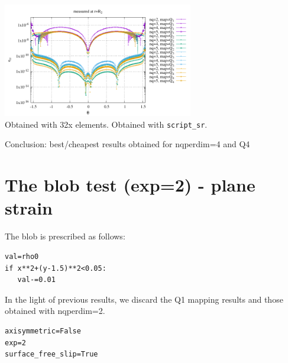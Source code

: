 \begin{center}
\includegraphics[width=8.3cm]{python_codes/fieldstone_152/results/exp1_axisymmetric/err_R2}\\
{\captionfont Obtained with 32x elements. Obtained with {\tt script\_sr}.}
\end{center}

Conclusion: best/cheapest results obtained for nqperdim=4 and Q4



\newpage
\section*{The blob test (exp=2) - plane strain}

The blob is prescribed as follows:
\begin{lstlisting}
val=rho0
if x**2+(y-1.5)**2<0.05:
   val-=0.01
\end{lstlisting}

In the light of previous results, we discard the Q1 mapping results 
and those obtained with {\python nqperdim=2}.

\begin{lstlisting}
axisymmetric=False
exp=2
surface_free_slip=True
\end{lstlisting}


